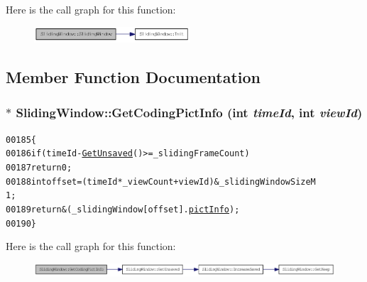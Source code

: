Here is the call graph for this function:\nopagebreak
\begin{figure}[H]
\begin{center}
\leavevmode
\includegraphics[width=165pt]{class_sliding_window_aa833d1b81d72234b0e37364295820e96_cgraph}
\end{center}
\end{figure}




\subsection{Member Function Documentation}
\hypertarget{class_sliding_window_ac50874323a2aaa4ef76fab47f80c9f92}{
\subsubsection[{GetCodingPictInfo}]{$\ast$ SlidingWindow::GetCodingPictInfo (int {\em timeId}, \/  int {\em viewId})}}
\label{class_sliding_window_ac50874323a2aaa4ef76fab47f80c9f92}




\begin{footnotesize}\begin{alltt}
00185         \{
00186                 \textcolor{keywordflow}{if} (timeId - \hyperlink{class_sliding_window_a3df64e20282ce10a45c4c3f3011e536d}{GetUnsaved}() >= \_slidingFrameCount)
00187                         \textcolor{keywordflow}{return} 0;
00188                 \textcolor{keywordtype}{int} offset = (timeId * \_viewCount + viewId) & \_slidingWindowSizeM
      1;
00189                 \textcolor{keywordflow}{return} &(\_slidingWindow[offset].\hyperlink{structtag_sliding_item_a3d1f87274664505c5fb9fe06d3cd16d3}{pictInfo});
00190         \}
\end{alltt}\end{footnotesize}




Here is the call graph for this function:\nopagebreak
\begin{figure}[H]
\begin{center}
\leavevmode
\includegraphics[width=366pt]{class_sliding_window_ac50874323a2aaa4ef76fab47f80c9f92_cgraph}
\end{center}
\end{figure}




